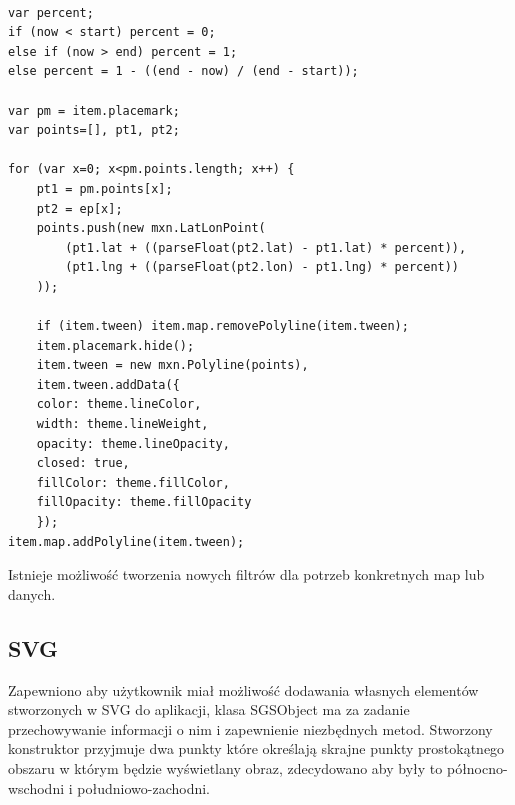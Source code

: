 \lstset{language=JavaScript}
\begin{lstlisting}[label={lst:minconf},caption={Filt animujący.}]

var percent;
if (now < start) percent = 0;
else if (now > end) percent = 1;
else percent = 1 - ((end - now) / (end - start));

var pm = item.placemark;
var points=[], pt1, pt2;

for (var x=0; x<pm.points.length; x++) {
    pt1 = pm.points[x];
    pt2 = ep[x];
    points.push(new mxn.LatLonPoint(
        (pt1.lat + ((parseFloat(pt2.lat) - pt1.lat) * percent)),
        (pt1.lng + ((parseFloat(pt2.lon) - pt1.lng) * percent))
    ));

    if (item.tween) item.map.removePolyline(item.tween);
    item.placemark.hide();
    item.tween = new mxn.Polyline(points),
    item.tween.addData({
    color: theme.lineColor,
    width: theme.lineWeight,
    opacity: theme.lineOpacity,
    closed: true,
    fillColor: theme.fillColor,
    fillOpacity: theme.fillOpacity
    });
item.map.addPolyline(item.tween);
\end{lstlisting}

Istnieje możliwość tworzenia nowych filtrów dla potrzeb konkretnych map lub danych.

\subsection{SVG}
\label{subsec:svgImpl}

Zapewniono aby użytkownik miał możliwość dodawania własnych elementów stworzonych w SVG do aplikacji, klasa SGSObject ma za zadanie przechowywanie informacji o nim i zapewnienie niezbędnych metod. Stworzony konstruktor przyjmuje dwa punkty które określają skrajne punkty prostokątnego obszaru w którym będzie wyświetlany obraz, zdecydowano aby były to północno-wschodni i południowo-zachodni.


